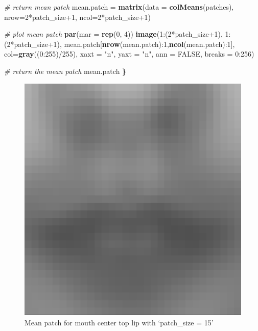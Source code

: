 \documentclass[]{article}
\newenvironment{Shaded}{\begin{snugshade}}{\end{snugshade}}
\newcommand{\KeywordTok}[1]{\textcolor[rgb]{0.13,0.29,0.53}{\textbf{{#1}}}}
\newcommand{\DataTypeTok}[1]{\textcolor[rgb]{0.13,0.29,0.53}{{#1}}}
\newcommand{\DecValTok}[1]{\textcolor[rgb]{0.00,0.00,0.81}{{#1}}}
\newcommand{\StringTok}[1]{\textcolor[rgb]{0.31,0.60,0.02}{{#1}}}
\newcommand{\CommentTok}[1]{\textcolor[rgb]{0.56,0.35,0.01}{\textit{{#1}}}}
\newcommand{\OtherTok}[1]{\textcolor[rgb]{0.56,0.35,0.01}{{#1}}}
\newcommand{\ErrorTok}[1]{\textcolor[rgb]{0.64,0.00,0.00}{\textbf{{#1}}}}
\newcommand{\NormalTok}[1]{{#1}}
\begin{document}
\begin{Shaded}
\begin{Highlighting}[]
  \CommentTok{# return mean patch}
  \NormalTok{mean.patch =}\StringTok{ }\KeywordTok{matrix}\NormalTok{(}\DataTypeTok{data =} \KeywordTok{colMeans}\NormalTok{(patches), }\DataTypeTok{nrow=}\DecValTok{2}\NormalTok{*patch_size}\DecValTok{+1}\NormalTok{, }\DataTypeTok{ncol=}\DecValTok{2}\NormalTok{*patch_size}\DecValTok{+1}\NormalTok{)}

  \CommentTok{# plot mean patch}
  \KeywordTok{par}\NormalTok{(}\DataTypeTok{mar =} \KeywordTok{rep}\NormalTok{(}\DecValTok{0}\NormalTok{, }\DecValTok{4}\NormalTok{))}
  \KeywordTok{image}\NormalTok{(}\DecValTok{1}\NormalTok{:(}\DecValTok{2}\NormalTok{*patch_size}\DecValTok{+1}\NormalTok{), }\DecValTok{1}\NormalTok{:(}\DecValTok{2}\NormalTok{*patch_size}\DecValTok{+1}\NormalTok{),}
        \NormalTok{mean.patch[}\KeywordTok{nrow}\NormalTok{(mean.patch):}\DecValTok{1}\NormalTok{,}\KeywordTok{ncol}\NormalTok{(mean.patch):}\DecValTok{1}\NormalTok{],}
        \DataTypeTok{col=}\KeywordTok{gray}\NormalTok{((}\DecValTok{0}\NormalTok{:}\DecValTok{255}\NormalTok{)/}\DecValTok{255}\NormalTok{), }\DataTypeTok{xaxt =} \StringTok{"n"}\NormalTok{, }\DataTypeTok{yaxt =} \StringTok{"n"}\NormalTok{, }\DataTypeTok{ann =} \OtherTok{FALSE}\NormalTok{, }\DataTypeTok{breaks =} \DecValTok{0}\NormalTok{:}\DecValTok{256}\NormalTok{)}

  \CommentTok{# return the mean patch}
  \NormalTok{mean.patch}
\ErrorTok{\}}
\end{Highlighting}
\end{Shaded}

\begin{figure}
\centering
\includegraphics{figures/mouth_15.pdf}
\caption{Mean patch for mouth center top lip with `patch\_size = 15'}
\end{figure}
\end{document}
